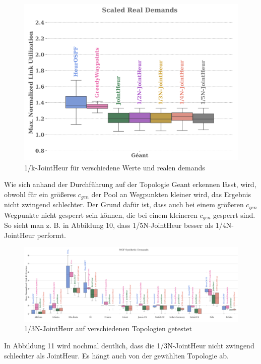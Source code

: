 \documentclass[sigconf,noacm,review]{acmart}
\begin{document}
\begin{figure}[h]
  \centering
  \includegraphics[width=\linewidth]{abbildungen/a32}
  \caption{1/k-JointHeur für verschiedene Werte und realen demands}
\end{figure}

Wie sich anhand der Durchführung auf der Topologie Geant erkennen lässt, wird, obwohl für ein größeres $c_{gen}$ der Pool an Wegpunkten kleiner wird, das Ergebnis nicht zwingend schlechter. Der Grund dafür ist, dass auch bei einem größeren  $c_{gen}$ Wegpunkte nicht gesperrt sein können, die bei einem kleineren  $c_{gen}$ gesperrt sind. So sieht man z. B. in Abbildung 10, dass  1/5N-JointHeur besser als 1/4N-JointHeur performt.

\begin{figure}[h]
  \centering
  \includegraphics[width=\linewidth]{abbildungen/a33}
  \caption{1/3N-JointHeur auf verschiedenen Topologien getestet}
\end{figure}

In Abbildung 11 wird nochmal deutlich, dass die 1/3N-JointHeur nicht zwingend schlechter als JointHeur. Es hängt auch von der gewählten Topologie ab.
\end{document}
